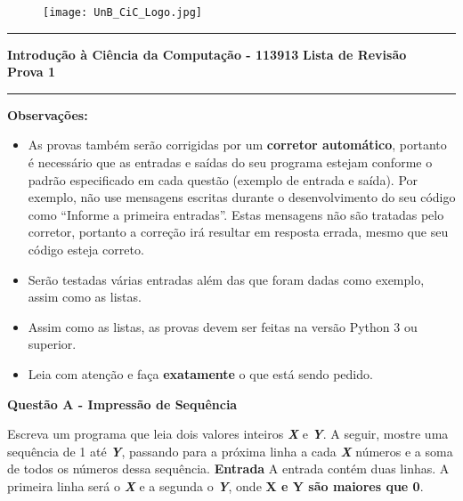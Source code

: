 \documentclass[a4paper, 12pt]{article}
\begin{document}
\begin{figure}[H]
	\texttt{[image: UnB\_CiC\_Logo.jpg]}
\end{figure}
\noindent\rule{\textwidth}{0.4pt}
\begin{center}
	\textbf{{\Large Introdução à Ciência da Computação - 113913}} \newline \newline
	\textbf{{\large Lista de Revisão} \\
	\vspace{9pt}
	{\large Prova 1}} \\
	\noindent\rule{\textwidth}{0.4pt}
	\newline
\end{center}

\textbf{{\large Observações:}}
\begin{itemize}
	\item As provas também serão corrigidas por um \textbf{corretor automático}, portanto é necessário que as entradas e saídas do seu programa estejam conforme o padrão especificado em cada questão (exemplo de entrada e saída). Por exemplo, não use mensagens escritas durante o desenvolvimento do seu código como ``Informe a primeira entradas''. Estas mensagens não são tratadas pelo corretor, portanto a correção irá resultar em resposta errada, mesmo que seu código esteja correto.
	\item Serão testadas várias entradas além das que foram dadas como exemplo, assim como as listas.
	\item Assim como as listas, as provas devem ser feitas na versão Python 3 ou superior.
	\item Leia com atenção e faça \textbf{exatamente} o que está sendo pedido.
\end{itemize}
\newpage %
\begin{center}
\textbf{{\Large Questão A - Impressão de Sequência}}
\end{center}
\vspace{5pt}
Escreva um programa que leia dois valores inteiros \textbf{\textit{X}} e \textbf{\textit{Y}}. A seguir, mostre uma sequência de 1 até \textbf{\textit{Y}}, passando para a próxima linha a cada \textbf{\textit{X}} números e a soma de todos os números dessa sequência.
\newline \newline
\textbf{{\large Entrada}} \newline
A entrada contém duas linhas. A primeira linha será o \textbf{\textit{X}} e a segunda o \textbf{\textit{Y}}, onde \textbf{X e Y são maiores que 0}.
\end{document}
